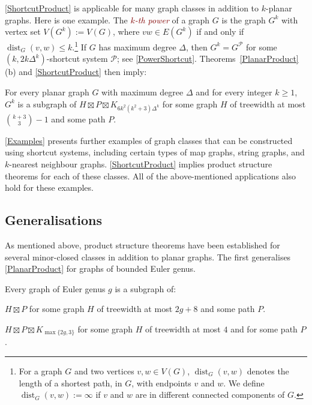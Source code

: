 \documentclass{patmorin}
\newcommand{\defin}[1]{\textcolor{Maroon}{\emph{#1}}}
\DeclareMathOperator{\dist}{dist}
\newcommand{\PP}{\mathcal{P}}
\renewcommand{\geq}{\geqslant}
\renewcommand{\leq}{\leqslant}
\begin{document}
\cref{ShortcutProduct} is applicable for many graph classes in addition to $k$-planar graphs. Here is one example. The \defin{$k$-th power} of a graph $G$ is the graph $G^k$ with vertex set $V(G^k):=V(G)$, where $vw\in E(G^k)$ if and only if $\dist_G(v,w)\leq k$.\footnote{For a graph $G$ and two vertices $v,w\in V(G)$, $\dist_G(v,w)$  denotes the length of a shortest path, in $G$, with endpoints $v$ and $w$.  We define $\dist_G(v,w):=\infty$ if $v$ and $w$ are in different connected components of $G$.} If $G$ has maximum degree $\Delta$, then $G^k = G^\PP$ for some $(k,2k\Delta^{k})$-shortcut system $\PP$; see \cref{PowerShortcut}. Theorems~\ref{PlanarProduct}(b) and \ref{ShortcutProduct} then imply:

\begin{thm}
\label{kPowerBasic}
For every planar graph $G$ with maximum degree $\Delta$ and for every integer $k\geq 1$, $G^k$ is a subgraph of $H\boxtimes P\boxtimes K_{6k^2(k^2+3)\Delta^{k}}$ for some graph $H$ of treewidth at most $\binom{k+3}{3}-1$ and some path $P$.
\end{thm}

\cref{Examples} presents further examples of graph classes that can be constructed using shortcut systems, including certain types of map graphs, string graphs, and $k$-nearest neighbour graphs. \cref{ShortcutProduct} implies product structure theorems for each of these classes. All of the above-mentioned applications also hold for these examples. 

\subsection{Generalisations}
\label{Generalisations}

As mentioned above, product structure theorems have been established for several minor-closed classes in addition to planar graphs. The first generalises \cref{PlanarProduct} for graphs of bounded Euler genus. 

\begin{thm}
	\label{GenusProduct}
	Every graph of Euler genus $g$ is a subgraph of:
	\begin{compactenum}[(a)]
		\item $H  \boxtimes P$ for some graph $H$ of treewidth at most $2g+8$  and some path $P$.
		\item $H \boxtimes P \boxtimes K_{\max\{2g,3\}}$ for some graph $H$ of treewidth at most $4$ and for some path $P$.\label{temp}
	\end{compactenum}
\end{thm}
\end{document}
